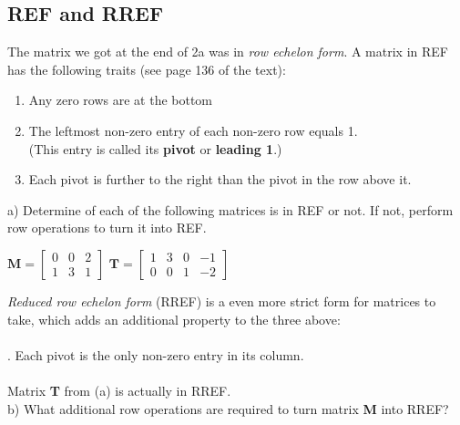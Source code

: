 \documentclass{article}
\begin{document}
\begin{flushleft}
\section{REF and RREF}
The matrix we got at the end of 2a was in \textit{row echelon form}. A matrix in REF has the following traits (see page 136 of the text):
\begin{enumerate}
\item Any zero rows are at the bottom
\item The leftmost non-zero entry of each non-zero row equals 1.\\
 (This entry is called its \textbf{pivot} or \textbf{leading 1}.)
\item Each pivot is further to the right than the pivot in the row above it.
\end{enumerate}
a) Determine of each of the following matrices is in REF or not. If not, perform row operations to turn it into REF.\\
\vspace{0.1in}
\begin{center}
$\textbf{M}=\begin{bmatrix}
0 & 0 & 2\\
1 & 3 & 1
\end{bmatrix}
$
\hspace{0.2in}
$\textbf{T}=\begin{bmatrix}
1 & 3 & 0 & -1 \\
0 & 0 & 1 & -2
\end{bmatrix}$\\
\end{center}
\vspace{1.5in}
\textit{Reduced row echelon form} (RREF) is a even more strict form for matrices to take, which adds an additional property to the three above:\\
\vspace{0.1in}
\hrulefill \\
. Each pivot is the only non-zero entry in its column.\\
\vspace{-3pt}
\hrulefill \\
\vspace{0.1in}
Matrix \textbf{T} from (a) is actually in RREF.\\


b) What additional row operations are required to turn matrix \textbf{M} into RREF?
\vspace{0.5in}
\newpage

\end{flushleft}
\end{document}
